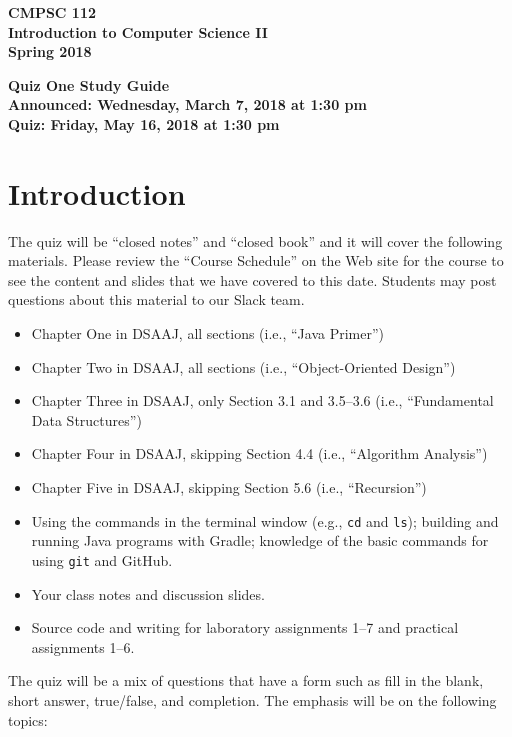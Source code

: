 \documentclass[11pt]{article}
\newcommand{\assignmentduedate}{May 16}
\newcommand{\assignmentassignedate}{March 7}
\newcommand{\assignmentnumber}{One}
\newcommand{\labyear}{2018}
\newcommand{\assignedday}{Wednesday}
\newcommand{\dueday}{Friday}
\newcommand{\labtime}{1:30 pm}
\newcommand{\assigneddate}{Announced: \assignedday, \assignmentassignedate, \labyear{} at \labtime{}}
\newcommand{\duedate}{Quiz: \dueday, \assignmentduedate, \labyear{} at \labtime{}}
\newcommand{\program}[1]{\lstinline{#1}}
\newcommand{\guidetitle}[1]
{
  \begin{center}
    \begin{center}
      \bf
      CMPSC 112\\Introduction to Computer Science II\\
      Spring 2018\\
      \medskip
    \end{center}
    \bf
    #1
  \end{center}
}
\begin{document}
\thispagestyle{empty}

\guidetitle{Quiz \assignmentnumber{} Study Guide \\ \assigneddate{} \\ \duedate{}}

\section*{Introduction}

\noindent
The quiz will be ``closed notes'' and ``closed book'' and it will cover the
following materials. Please review the ``Course Schedule'' on the Web site for
the course to see the content and slides that we have covered to this date.
Students may post questions about this material to our Slack team.

\begin{itemize}

  \itemsep 0in

  \item Chapter One in DSAAJ, all sections (i.e., ``Java Primer'')

  \item Chapter Two in DSAAJ, all sections (i.e., ``Object-Oriented Design'')

  \item Chapter Three in DSAAJ, only Section 3.1 and 3.5--3.6 (i.e., ``Fundamental Data Structures'')

  \item Chapter Four in DSAAJ, skipping Section 4.4 (i.e., ``Algorithm Analysis'')

  \item Chapter Five in DSAAJ, skipping Section 5.6 (i.e., ``Recursion'')

  \item Using the commands in the terminal window (e.g., \program{cd} and
    \program{ls}); building and running Java programs with Gradle; knowledge of
    the basic commands for using \program{git} and GitHub.

  \item Your class notes and discussion slides.

  \item Source code and writing for laboratory assignments 1--7 and practical
    assignments 1--6.

\end{itemize}

\noindent The quiz will be a mix of questions that have a form such as fill in
the blank, short answer, true/false, and completion. The emphasis will be on the
following topics:
\end{document}
